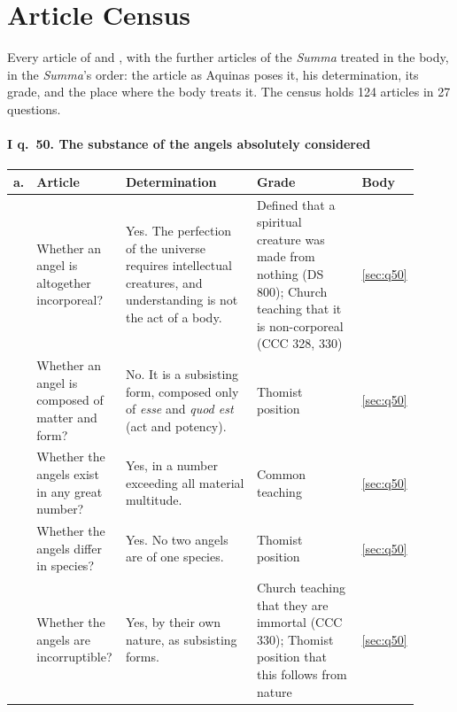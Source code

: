 \section{Article Census}\label{app:census}

Every article of  and , with the
further articles of the \emph{Summa} treated in the body, in the
\emph{Summa}'s order: the article as Aquinas poses it, his
determination, its grade, and the place where the body treats it.
The census holds 124 articles in 27 questions.

\paragraph{I q.~50. The substance of the angels absolutely considered}

\begingroup\footnotesize
\begin{longtable}{>{\raggedright\arraybackslash}p{0.03\linewidth}>{\raggedright\arraybackslash}p{0.22\linewidth}>{\raggedright\arraybackslash}p{0.33\linewidth}>{\raggedright\arraybackslash}p{0.27\linewidth}>{\raggedright\arraybackslash}p{0.06\linewidth}}
\toprule
\textbf{a.} & \textbf{Article} & \textbf{Determination} & \textbf{Grade} & \textbf{Body}\\
\midrule
\endhead
1 & Whether an angel is altogether incorporeal? & Yes. The perfection of the universe requires intellectual creatures, and understanding is not the act of a body. & Defined that a spiritual creature was made from nothing (DS 800); Church teaching that it is non-corporeal (CCC 328, 330) & \ref{sec:q50}\\
2 & Whether an angel is composed of matter and form? & No. It is a subsisting form, composed only of \emph{esse} and \emph{quod est} (act and potency). & Thomist position & \ref{sec:q50}\\
3 & Whether the angels exist in any great number? & Yes, in a number exceeding all material multitude. & Common teaching & \ref{sec:q50}\\
4 & Whether the angels differ in species? & Yes. No two angels are of one species. & Thomist position & \ref{sec:q50}\\
5 & Whether the angels are incorruptible? & Yes, by their own nature, as subsisting forms. & Church teaching that they are immortal (CCC 330); Thomist position that this follows from nature & \ref{sec:q50}\\
\bottomrule
\end{longtable}
\endgroup

